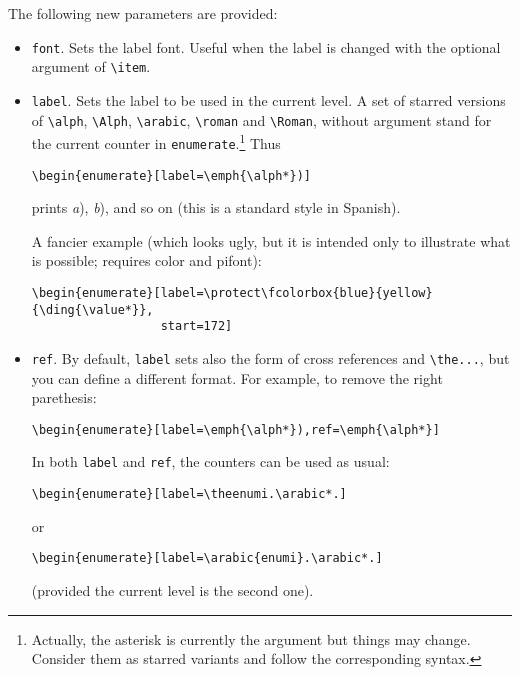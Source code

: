 \documentclass{article}
\begin{document}
The following new parameters are provided:
\begin{itemize}


\item \verb|font|. Sets the label font. Useful when the label is
changed with the optional argument of \verb|\item|.

\item \verb|label|.  Sets the label to be used in the current level.
A set of starred versions of \verb|\alph|, \verb|\Alph|,
\verb|\arabic|, \verb|\roman| and \verb|\Roman|, without argument
stand for the current counter in \verb|enumerate|.\footnote{Actually,
the asterisk is currently the argument but things may change.
Consider them as starred variants and follow the corresponding
syntax.} Thus
\begin{verbatim}
\begin{enumerate}[label=\emph{\alph*})]
\end{verbatim}
prints \textit{a}), \textit{b}), and so on (this is a
standard style in Spanish).

A fancier example (which looks ugly, but it is intended only
to illustrate what is possible; requires \textsf{color} and
\textsf{pifont}):
\begin{verbatim}
\begin{enumerate}[label=\protect\fcolorbox{blue}{yellow}{\ding{\value*}},
                  start=172]
\end{verbatim}

\item \verb|ref|. By default, \verb|label| sets also the form of cross
references and \verb|\the...|, but you can define a
different format. For
example, to remove the right parethesis:
\begin{verbatim}
\begin{enumerate}[label=\emph{\alph*}),ref=\emph{\alph*}]
\end{verbatim}
In both \verb|label| and \verb|ref|, the counters can be
used as usual:
\begin{verbatim}
\begin{enumerate}[label=\theenumi.\arabic*.]
\end{verbatim}
or
\begin{verbatim}
\begin{enumerate}[label=\arabic{enumi}.\arabic*.]
\end{verbatim}
(provided the current level is the second one).


\end{itemize}
\end{document}
